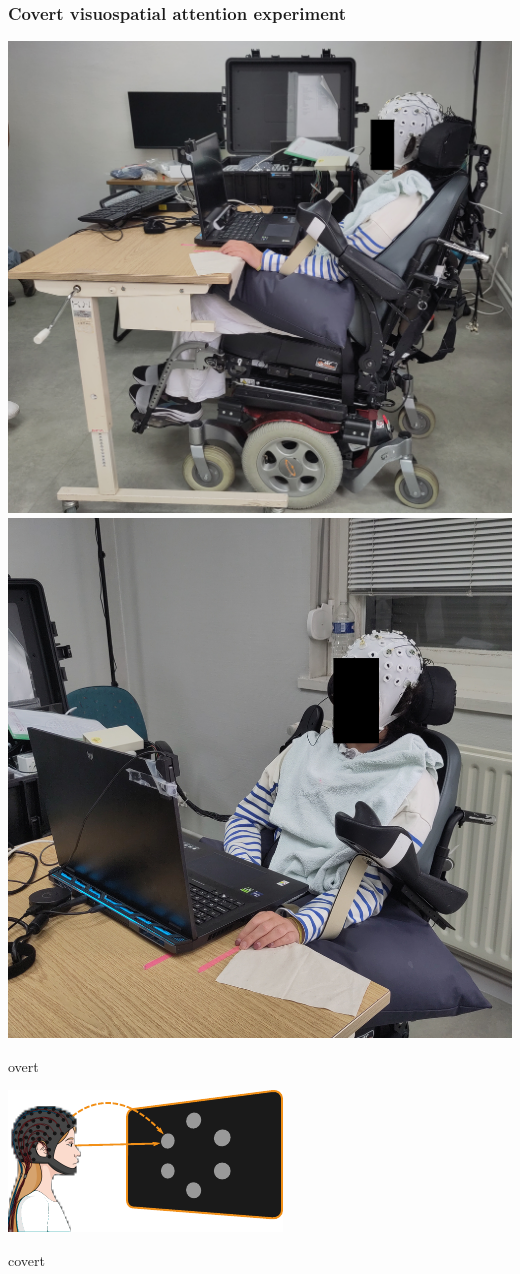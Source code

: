 \documentclass{kul-ulille-beamer}
\begin{document}
\begin{frame}
  \frametitle{Covert visuospatial attention experiment}

  \begin{minipage}{.6\textwidth}
    \includegraphics[height=.45\textwidth]{figures/patients/PD01a-obfuscated.jpg}%
    \hfill%
    \includegraphics[height=.45\textwidth]{figures/patients/PD01b-obfuscated.jpg}%
    \bigskip

    {\small
    \begin{minipage}{.3\textwidth}
      overt
      \smallskip

      \includegraphics[width=\textwidth]{figures/covert/attention_overt.pdf}
    \end{minipage}\hfill%
    \begin{minipage}{.3\textwidth}
      covert
      \smallskip


\end{minipage}}
\end{minipage}
\end{frame}
\end{document}
